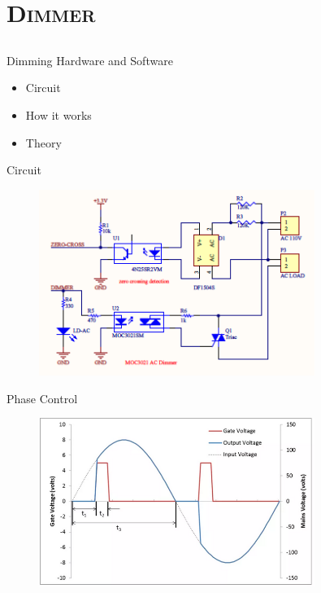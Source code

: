 	
	\section{\scshape Dimmer}
	\subsection{}
	\begin{frame}{Dimming Hardware and Software}
		\begin{itemize}
			\item Circuit
			\item How it works
			\item Theory
		\end{itemize}
		
	\end{frame}
	
	\begin{frame}{Circuit}
		
		\begin{figure}[ht!]
			\centering
			\includegraphics[width=0.8\textwidth]{Circuit.png}
			\label{fig:circuit}
		\end{figure} 
		
	\end{frame}
	
	\begin{frame}{Phase Control}
		
		\begin{figure}[ht!]
			\centering
			\includegraphics[width=0.8\textwidth]{Phase.png}
			\label{fig:circuit}
		\end{figure} 
		
	\end{frame}


